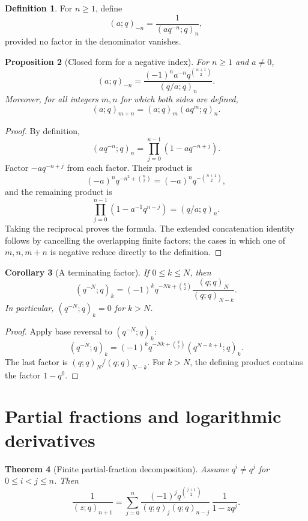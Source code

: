 \documentclass[11pt,oneside,openany]{book}
\newtheorem{theorem}{Theorem}[chapter]
\newtheorem{proposition}[theorem]{Proposition}
\newtheorem{corollary}[theorem]{Corollary}
\theoremstyle{definition}
\newtheorem{definition}[theorem]{Definition}
\theoremstyle{remark}
\begin{document}
\begin{definition}
For $n\ge1$, define
\[
 (a;q)_{-n}=\frac{1}{(aq^{-n};q)_n},
\]
provided no factor in the denominator vanishes.
\end{definition}

\begin{proposition}[Closed form for a negative index]\label{prop:negative-index}
For $n\ge1$ and $a\ne0$,
\[
 (a;q)_{-n}
 =\frac{(-1)^n a^{-n}q^{\binom{n+1}{2}}}{(q/a;q)_n}.
\]
Moreover, for all integers $m,n$ for which both sides are defined,
\[
 (a;q)_{m+n}=(a;q)_m(aq^m;q)_n.
\]
\end{proposition}

\begin{proof}
By definition,
\[
 (aq^{-n};q)_n=\prod_{j=0}^{n-1}(1-aq^{-n+j}).
\]
Factor $-a q^{-n+j}$ from each factor.  Their product is
\[
 (-a)^nq^{-n^2+\binom n2}=(-a)^nq^{-\binom{n+1}{2}},
\]
and the remaining product is
\[
 \prod_{j=0}^{n-1}(1-a^{-1}q^{n-j})=(q/a;q)_n.
\]
Taking the reciprocal proves the formula.  The extended concatenation identity follows by cancelling the overlapping finite factors; the cases in which one of $m,n,m+n$ is negative reduce directly to the definition.
\end{proof}

\begin{corollary}[A terminating factor]\label{cor:qminusN}
If $0\le k\le N$, then
\[
 (q^{-N};q)_k=(-1)^kq^{-Nk+\binom k2}
 \frac{(q;q)_N}{(q;q)_{N-k}}.
\]
In particular, $(q^{-N};q)_k=0$ for $k>N$.
\end{corollary}

\begin{proof}
Apply base reversal to $(q^{-N};q)_k$:
\[
 (q^{-N};q)_k=(-1)^kq^{-Nk+\binom k2}(q^{N-k+1};q)_k.
\]
The last factor is $(q;q)_N/(q;q)_{N-k}$.  For $k>N$, the defining product contains the factor $1-q^0$.
\end{proof}

\section{Partial fractions and logarithmic derivatives}

\begin{theorem}[Finite partial-fraction decomposition]\label{thm:partial-fraction}
Assume $q^i\ne q^j$ for $0\le i<j\le n$.  Then
\[
 \frac{1}{(z;q)_{n+1}}
 =\sum_{j=0}^{n}
 \frac{(-1)^j q^{\binom{j+1}{2}}}
 {(q;q)_j(q;q)_{n-j}}\,
 \frac{1}{1-zq^j}.
\]
\end{theorem}
\end{document}
